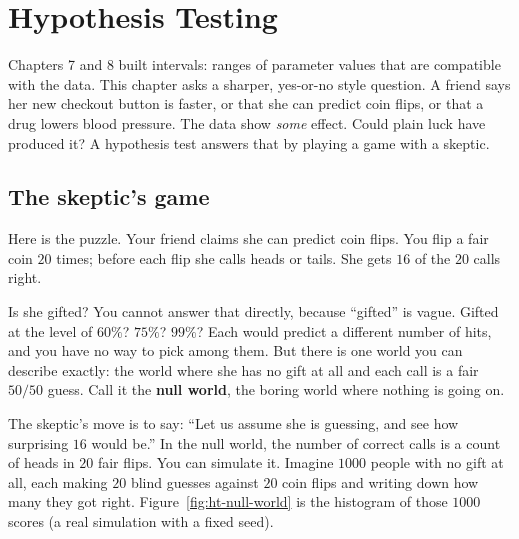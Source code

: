 \chapter{Hypothesis Testing}
\label{ch:hypothesis-testing}

Chapters 7 and 8 built intervals: ranges of parameter values that are compatible
with the data. This chapter asks a sharper, yes-or-no style question. A friend
says her new checkout button is faster, or that she can predict coin flips, or that
a drug lowers blood pressure. The data show \emph{some} effect. Could plain luck
have produced it? A hypothesis test answers that by playing a game with a skeptic.

\section{The skeptic's game}
\label{sec:ht-skeptic}

Here is the puzzle. Your friend claims she can predict coin flips. You flip a fair
coin $20$ times; before each flip she calls heads or tails. She gets $16$ of the
$20$ calls right.

Is she gifted? You cannot answer that directly, because ``gifted'' is vague. Gifted
at the level of $60\%$? $75\%$? $99\%$? Each would predict a different number of
hits, and you have no way to pick among them. But there is one world you can describe
exactly: the world where she has no gift at all and each call is a fair
$50/50$ guess. Call it the \textbf{null world}, the boring world where nothing is
going on.

The skeptic's move is to say: ``Let us assume she is guessing, and see how
surprising $16$ would be.'' In the null world, the number of correct calls is a
count of heads in $20$ fair flips. You can simulate it. Imagine $1000$ people with
no gift at all, each making $20$ blind guesses against $20$ coin flips and writing
down how many they got right. Figure~\ref{fig:ht-null-world} is the histogram of
those $1000$ scores (a real simulation with a fixed seed).

